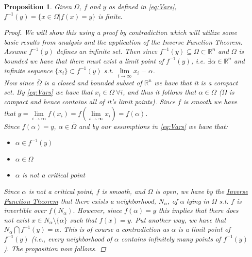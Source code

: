 \documentclass[11pt]{article}
\theoremstyle{plain}
\newtheorem{prop}[thm]{Proposition}
\theoremstyle{definition}
\theoremstyle{remark}
\begin{document}
\begin{prop} \label{finite}
Given $\Omega$, $f$ and $y$ as defined in \eqref{eq:Vars}, $f^{-1}(y)=\{x\in\Omega|f(x)=y\}$ is finite. 
\begin{proof}
We will show this using a proof by contradiction which will utilize some basic results from analysis and the application of the Inverse Function Theorem. \\

Assume $f^{-1}(y)$ defines an infinite set. Then since $f^{-1}(y)\subseteq\Omega\subset\mathbb{R}^n$ and $\Omega$ is bounded we have that there must exist a limit point of $f^{-1}(y)$, i.e. $\exists \alpha\in\mathbb{R}^n$ and infinite sequence $\{x_i\}\subset f^{-1}(y)$ s.t. $\lim\limits_{i\rightarrow\infty}x_i=\alpha$. \\

Now since $\bar{\Omega}$ is a closed and bounded subset of $\mathbb{R}^n$ we have that it is a compact set. By \eqref{eq:Vars} we have that $x_i\in\Omega \ \forall i$, and thus it follows that $\alpha\in\bar{\Omega}$ ($\bar{\Omega}$ is compact and hence contains all of it's limit points). Since $f$ is smooth we have that $y=\lim\limits_{i\rightarrow\infty}f(x_i)=f\left(\lim\limits_{i\rightarrow\infty}x_i\right)=f(\alpha)$.\\

Since $f(\alpha)=y$, $\alpha\in\bar{\Omega}$ and by our assumptions in \eqref{eq:Vars} we have that:
\begin{itemize}
\item $\alpha\in f^{-1}(y)$
\item $\alpha\in \Omega$
\item $\alpha$ is not a critical point
\end{itemize}

Since $\alpha$ is not a critical point, $f$ is smooth, and $\Omega$ is open, we have by the \href{https://en.wikipedia.org/wiki/Inverse_function_theorem}{Inverse Function Theorem} that there exists a neighborhood, $N_{\alpha}$, of $\alpha$ lying in $\Omega$ s.t. $f$ is invertible over $f(N_{\alpha})$.
However, since $f(\alpha)=y$ this implies that there does not exist $x\in N_{\alpha}\setminus\{\alpha\}$ such that $f(x)=y$.
Put another way, we have that $N_{\alpha}\bigcap f^{-1}(y)=\alpha$. This is of course a contradiction as $\alpha$ is a limit point of $f^{-1}(y)$ (i.e., every neighborhood of $\alpha$ contains infinitely many points of $f^{-1}(y)$).
The proposition now follows.
\end{proof}
\end{prop}
\end{document}

